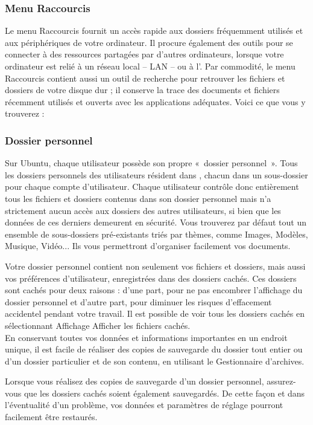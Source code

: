 \subsubsection{Menu Raccourcis}
Le menu Raccourcis fournit un accès rapide aux dossiers fréquemment utilisés et aux périphériques de votre ordinateur. Il procure également des outils pour se connecter à des ressources partagées par d'autres ordinateurs, lorsque votre ordinateur est relié à un réseau local -- LAN -- ou à l'. Par commodité, le menu Raccourcis contient aussi un outil de recherche pour retrouver les fichiers et dossiers de votre disque dur ; il conserve la trace des documents et fichiers récemment utilisés et ouverts avec les applications adéquates. Voici ce que vous y trouverez :
\subsubsection{Dossier personnel}
Sur Ubuntu, chaque utilisateur possède son propre «~dossier personnel~». Tous les dossiers personnels des utilisateurs résident dans , chacun dans un sous-dossier pour chaque compte d'utilisateur. Chaque utilisateur contrôle donc entièrement tous les fichiers et dossiers contenus dans son dossier personnel mais n'a strictement aucun accès aux dossiers des autres utilisateurs, si bien que les données de ces derniers demeurent en sécurité. 
Vous trouverez par défaut tout un ensemble de sous-dossiers pré-existants triés par thèmes, comme Images, Modèles, Musique, Vidéo... Ils vous permettront d'organiser facilement vos documents.\par
Votre dossier personnel contient non seulement vos fichiers et dossiers, mais aussi vos préférences d'utilisateur, enregistrées dans des dossiers cachés. Ces dossiers sont cachés pour deux raisons : d'une part, pour ne pas encombrer l'affichage du dossier personnel et d'autre part, pour diminuer les risques d'effacement accidentel pendant votre travail. Il est possible de voir tous les dossiers cachés en sélectionnant Affichage \FlecheDroite Afficher les fichiers cachés.\\
En conservant toutes vos données et informations importantes en un endroit unique, il est facile de réaliser des copies de sauvegarde du dossier tout entier ou d'un dossier particulier et de son contenu, en utilisant le Gestionnaire d'archives.
\begin{nota}
Lorsque vous réalisez des copies de sauvegarde d'un dossier personnel, assurez-vous que les dossiers cachés soient également sauvegardés. De cette façon et dans l'éventualité d'un problème, vos données et paramètres de réglage pourront facilement être restaurés. 
\end{nota}
